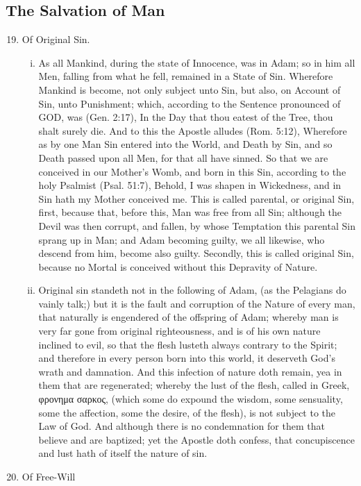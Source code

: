 \subsection{The Salvation of Man}
\begin{enumerate}
\setcounter{enumi}{18}
	\item Of Original Sin.
	\begin{enumerate}[i.]
		\item As all Mankind, during the state of Innocence, was in Adam; so in him all Men, falling from what he fell, remained in a State of Sin. Wherefore Mankind is become, not only subject unto Sin, but also, on Account of Sin, unto Punishment; which, according to the Sentence pronounced of GOD, was (Gen. 2:17), In the Day that thou eatest of the Tree, thou shalt surely die. And to this the Apostle alludes (Rom. 5:12), Wherefore as by one Man Sin entered into the World, and Death by Sin, and so Death passed upon all Men, for that all have sinned. So that we are conceived in our Mother’s Womb, and born in this Sin, according to the holy Psalmist (Psal. 51:7), Behold, I was shapen in Wickedness, and in Sin hath my Mother conceived me. This is called parental, or original Sin, first, because that, before this, Man was free from all Sin; although the Devil was then corrupt, and fallen, by whose Temptation this parental Sin sprang up in Man; and Adam becoming guilty, we all likewise, who descend from him, become also guilty. Secondly, this is called original Sin, because no Mortal is conceived without this Depravity of Nature.
		\item Original sin standeth not in the following of Adam, (as the Pelagians do vainly talk;) but it is the fault and corruption of the Nature of every man, that naturally is engendered of the offspring of Adam; whereby man is very far gone from original righteousness, and is of his own nature inclined to evil, so that the flesh lusteth always contrary to the Spirit; and therefore in every person born into this world, it deserveth God's wrath and damnation. And this infection of nature doth remain, yea in them that are regenerated; whereby the lust of the flesh, called in Greek, φρονημα σαρκος, (which some do expound the wisdom, some sensuality, some the affection, some the desire, of the flesh), is not subject to the Law of God. And although there is no condemnation for them that believe and are baptized; yet the Apostle doth confess, that concupiscence and lust hath of itself the nature of sin.
	\end{enumerate}
	\item Of Free-Will

\end{enumerate}
